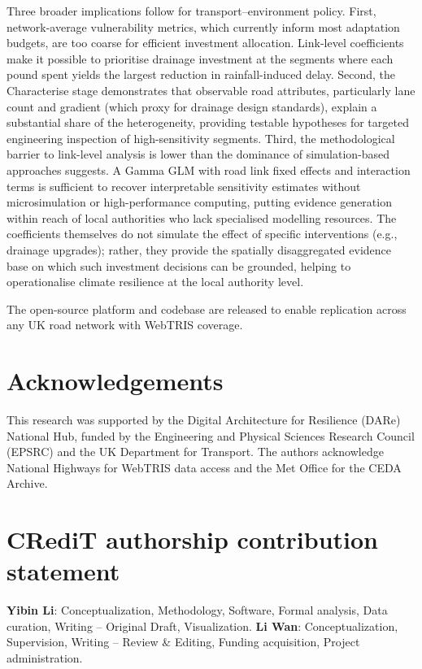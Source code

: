 \documentclass[review,authoryear]{elsarticle}
\begin{document}
Three broader implications follow for transport--environment policy. First, network-average vulnerability metrics, which currently inform most adaptation budgets, are too coarse for efficient investment allocation. Link-level coefficients make it possible to prioritise drainage investment at the segments where each pound spent yields the largest reduction in rainfall-induced delay. Second, the Characterise stage demonstrates that observable road attributes, particularly lane count and gradient (which proxy for drainage design standards), explain a substantial share of the heterogeneity, providing testable hypotheses for targeted engineering inspection of high-sensitivity segments. Third, the methodological barrier to link-level analysis is lower than the dominance of simulation-based approaches suggests. A Gamma GLM with road link fixed effects and interaction terms is sufficient to recover interpretable sensitivity estimates without microsimulation or high-performance computing, putting evidence generation within reach of local authorities who lack specialised modelling resources. The coefficients themselves do not simulate the effect of specific interventions (e.g., drainage upgrades); rather, they provide the spatially disaggregated evidence base on which such investment decisions can be grounded, helping to operationalise climate resilience at the local authority level.

The open-source platform and codebase are released to enable replication across any UK road network with WebTRIS coverage.


\section*{Acknowledgements}

This research was supported by the Digital Architecture for Resilience (DARe) National Hub, funded by the Engineering and Physical Sciences Research Council (EPSRC) and the UK Department for Transport. The authors acknowledge National Highways for WebTRIS data access and the Met Office for the CEDA Archive.

\section*{CRediT authorship contribution statement}

\textbf{Yibin Li}: Conceptualization, Methodology, Software, Formal analysis, Data curation, Writing -- Original Draft, Visualization. \textbf{Li Wan}: Conceptualization, Supervision, Writing -- Review \& Editing, Funding acquisition, Project administration.
\end{document}
